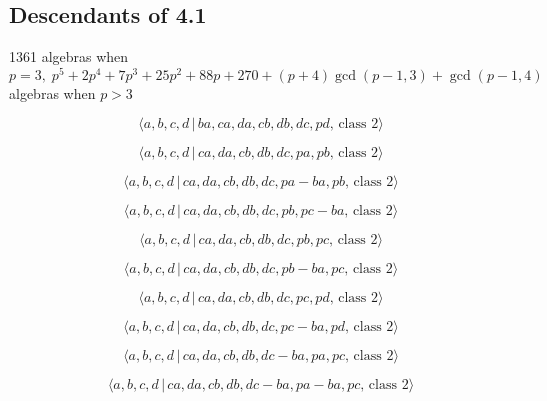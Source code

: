 \documentclass[10pt]{article}
\begin{document}
\subsection{Descendants of 4.1}

1361 algebras when $p=3,\;p^{5}+2p^{4}+7p^{3}+25p^{2}+88p+270+(p+4)\gcd
(p-1,3)+\gcd (p-1,4)$ algebras when $p>3$

\begin{equation}
\langle a,b,c,d\,|\,ba,ca,da,cb,db,dc,pd,\,\text{class }2\rangle 
\tag{7.2949}
\end{equation}

\begin{equation}
\langle a,b,c,d\,|\,ca,da,cb,db,dc,pa,pb,\,\text{class }2\rangle 
\tag{7.2950}
\end{equation}

\begin{equation}
\langle a,b,c,d\,|\,ca,da,cb,db,dc,pa-ba,pb,\,\text{class }2\rangle 
\tag{7.2951}
\end{equation}

\begin{equation}
\langle a,b,c,d\,|\,ca,da,cb,db,dc,pb,pc-ba,\,\text{class }2\rangle 
\tag{7.2952}
\end{equation}

\begin{equation}
\langle a,b,c,d\,|\,ca,da,cb,db,dc,pb,pc,\,\text{class }2\rangle 
\tag{7.2953}
\end{equation}

\begin{equation}
\langle a,b,c,d\,|\,ca,da,cb,db,dc,pb-ba,pc,\,\text{class }2\rangle 
\tag{7.2954}
\end{equation}

\begin{equation}
\langle a,b,c,d\,|\,ca,da,cb,db,dc,pc,pd,\,\text{class }2\rangle 
\tag{7.2955}
\end{equation}

\begin{equation}
\langle a,b,c,d\,|\,ca,da,cb,db,dc,pc-ba,pd,\,\text{class }2\rangle 
\tag{7.2956}
\end{equation}

\begin{equation}
\langle a,b,c,d\,|\,ca,da,cb,db,dc-ba,pa,pc,\,\text{class }2\rangle 
\tag{7.2957}
\end{equation}

\begin{equation}
\langle a,b,c,d\,|\,ca,da,cb,db,dc-ba,pa-ba,pc,\,\text{class }2\rangle 
\tag{7.2958}
\end{equation}
\end{document}

